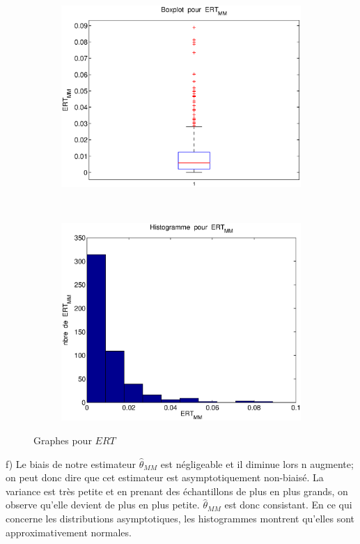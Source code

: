 \begin{figure}[!ht]
        \centering
        \begin{subfigure}[b]{0.5\textwidth}
                \includegraphics[width=\textwidth]{graphes/boxplot_ertmm.eps}
        \end{subfigure}%
        ~ 
        \begin{subfigure}[b]{0.5\textwidth}
                \includegraphics[width=\textwidth]{graphes/hist_ertmm.eps}
        \end{subfigure}
        \caption{Graphes pour $ERT$}\label{fig:ertmm}
\end{figure}

f) Le biais de notre estimateur $\hat\theta_{MM}$ est négligeable et il diminue lors n augmente; on peut donc dire que cet estimateur est asymptotiquement non-biaisé. La variance est très petite et en prenant des échantillons de plus en plus grands, on observe qu'elle devient de plus en plus petite. $\hat\theta_{MM}$ est donc consistant. En ce qui concerne les distributions asymptotiques, les histogrammes montrent qu’elles sont approximativement normales.
